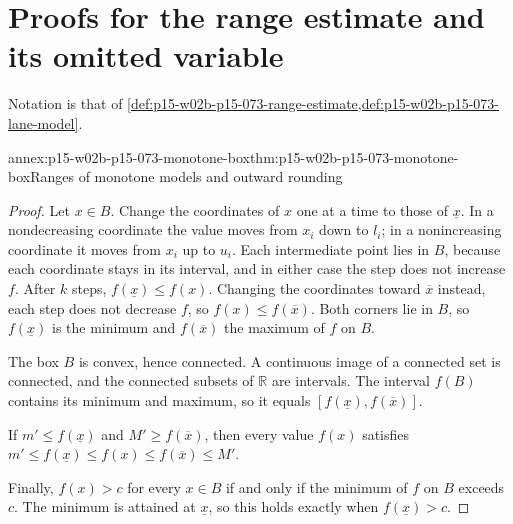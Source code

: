 \section{Proofs for the range estimate and its omitted variable}
\label{sec:annex-p15-w02b-p15-073}

Notation is that of
\cref{def:p15-w02b-p15-073-range-estimate,def:p15-w02b-p15-073-lane-model}.

\begin{annexitem}{annex:p15-w02b-p15-073-monotone-box}{thm:p15-w02b-p15-073-monotone-box}{Ranges of monotone models and outward rounding}
\begin{proof}
Let \(x\in B\). Change the coordinates of \(x\) one at a time to those of
\(\underline x\). In a nondecreasing coordinate the value moves from
\(x_i\) down to \(l_i\); in a nonincreasing coordinate it moves from \(x_i\)
up to \(u_i\). Each intermediate point lies in \(B\), because each coordinate
stays in its interval, and in either case the step does not increase \(f\).
After \(k\) steps, \(f(\underline x)\leq f(x)\). Changing the coordinates
toward \(\overline x\) instead, each step does not decrease \(f\), so
\(f(x)\leq f(\overline x)\). Both corners lie in \(B\), so
\(f(\underline x)\) is the minimum and \(f(\overline x)\) the maximum of \(f\)
on \(B\).

The box \(B\) is convex, hence connected. A continuous image of a connected
set is connected, and the connected subsets of \(\mathbb R\) are intervals.
The interval \(f(B)\) contains its minimum and maximum, so it equals
\([f(\underline x),f(\overline x)]\).

If \(m'\leq f(\underline x)\) and \(M'\geq f(\overline x)\), then every value
\(f(x)\) satisfies \(m'\leq f(\underline x)\leq f(x)\leq f(\overline x)\leq M'\).

Finally, \(f(x)>c\) for every \(x\in B\) if and only if the minimum of \(f\)
on \(B\) exceeds \(c\). The minimum is attained at \(\underline x\), so this
holds exactly when \(f(\underline x)>c\).
\end{proof}
\end{annexitem}

